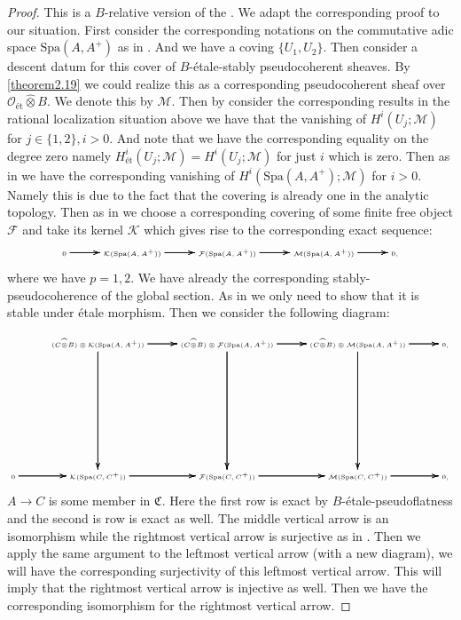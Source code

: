 \documentclass[12pt]{amsart}
\theoremstyle{definition}
\numberwithin{equation}{section}
\begin{document}
\begin{proof}
This is a $B$-relative version of the \cite[Lemma 2.5.13]{KL2}. We adapt the corresponding proof to our situation. First consider the corresponding notations on the commutative adic space $\mathrm{Spa}(A,A^+)$ as in \cite[Lemma 2.4.10]{KL2}. And we have a coving $\{U_1,U_2\}$. Then consider a descent datum for this cover of $B$-\'etale-stably pseudocoherent sheaves. By \cref{theorem2.19} we could realize this as a corresponding pseudocoherent sheaf over $\mathcal{O}_{\text{\'et}}\widehat{\otimes}B$. We denote this by $\mathcal{M}$. Then by consider the corresponding results in the rational localization situation above we have that the vanishing of $H^i(U_j;\mathcal{M})$ for $j\in \{1,2\},i>0$. And note that we have the corresponding equality on the degree zero namely $H^i_\text{\'et}(U_j;\mathcal{M})=H^i(U_j;\mathcal{M})$ for just $i$ which is zero. Then as in \cite[Lemma 2.5.13]{KL2} we have the corresponding vanishing of $H^i(\mathrm{Spa}(A,A^+);\mathcal{M})$ for $i>0$. Namely this is due to the fact that the covering is already one in the analytic topology. Then as in \cite[Lemma 2.5.13]{KL2} we choose a corresponding covering of some finite free object $\mathcal{F}$ and take its kernel $\mathcal{K}$ which gives rise to the corresponding exact sequence:
\[\tiny
\xymatrix@C+0pc@R+6pc{
0 \ar[r]\ar[r]\ar[r] &\mathcal{K}(\mathrm{Spa}(A,A^+))   \ar[r]\ar[r]\ar[r] &\mathcal{F}(\mathrm{Spa}(A,A^+)) \ar[r]\ar[r]\ar[r] & \mathcal{M}(\mathrm{Spa}(A,A^+)) \ar[r]\ar[r]\ar[r] &0,
}
\]
where we have $p=1,2$. We have already the corresponding stably-pseudocoherence of the global section. As in \cite[Lemma 2.5.13]{KL2} we only need to show that it is stable under \'etale morphism. Then we consider the following diagram:

\[ \tiny
\xymatrix@C+0pc@R+6pc{
 &(C\widehat{\otimes}B)\otimes\mathcal{K}(\mathrm{Spa}(A,A^+))   \ar[r]\ar[r]\ar[r] \ar[d]\ar[d]\ar[d] &(C\widehat{\otimes}B)\otimes\mathcal{F}(\mathrm{Spa}(A,A^+)) \ar[r]\ar[r]\ar[r] \ar[d]\ar[d]\ar[d] & (C\widehat{\otimes}B)\otimes\mathcal{M}(\mathrm{Spa}(A,A^+))\ar[r]\ar[r]\ar[r]  \ar[d]\ar[d]\ar[d]&0,\\
0 \ar[r]\ar[r]\ar[r] &\mathcal{K}(\mathrm{Spa}(C,C^+))   \ar[r]\ar[r]\ar[r] &\mathcal{F}(\mathrm{Spa}(C,C^+)) \ar[r]\ar[r]\ar[r] & \mathcal{M}(\mathrm{Spa}(C,C^+)) \ar[r]\ar[r]\ar[r] &0,\\
}
\]
$A\rightarrow C$ is some member in $\mathfrak{C}$. Here the first row is exact by $B$-\'etale-pseudoflatness and the second is row is exact as well. The middle vertical arrow is an isomorphism while the rightmost vertical arrow is surjective as in \cite[Lemma 2.5.13]{KL2}. Then we apply the same argument to the leftmost vertical arrow (with a new diagram), we will have the corresponding surjectivity of this leftmost vertical arrow. This will imply that the rightmost vertical arrow is injective as well. Then we have the corresponding isomorphism for the rightmost vertical arrow.
\end{proof}
\end{document}
